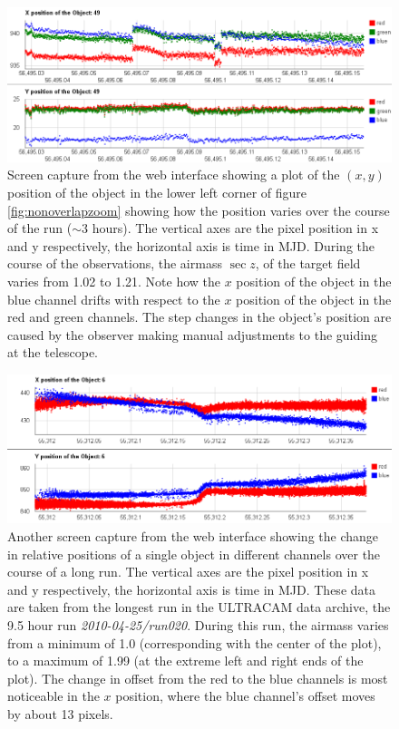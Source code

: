 \begin{figure}
  \centering
  \includegraphics[width=140mm]{images/position_drift.png}
  \caption{Screen capture from the web interface showing a plot of the $(x, y)$ position of the object in the lower left corner of figure \ref{fig:nonoverlapzoom} showing how the position varies over the course of the run ($\sim 3$ hours). The vertical axes are the pixel position in x and y respectively, the horizontal axis is time in MJD. During the course of the observations, the airmass $\sec z$, of the target field varies from 1.02 to 1.21. Note how the $x$ position of the object in the blue channel drifts with respect to the $x$ position of the object in the red and green channels. The step changes in the object's position are caused by the observer making manual adjustments to the guiding at the telescope. }
\label{fig:positiondrift}
\end{figure}

\begin{figure}
  \centering
  \includegraphics[width=140mm]{images/position_drift_longrun.png}
   \caption{Another screen capture from the web interface showing the change in relative positions of a single object in different channels over the course of a long run. The vertical axes are the pixel position in x and y respectively, the horizontal axis is time in MJD. These data are taken from the longest run in the ULTRACAM data archive, the 9.5 hour run \emph{2010-04-25/run020}. During this run, the airmass varies from a minimum of 1.0 (corresponding with the center of the plot), to a maximum of 1.99 (at the extreme left and right ends of the plot). The change in offset from the red to the blue channels is most noticeable in the $x$ position, where the blue channel's offset moves by about 13 pixels. }
\label{fig:positiondriftlongrun}
\end{figure}

